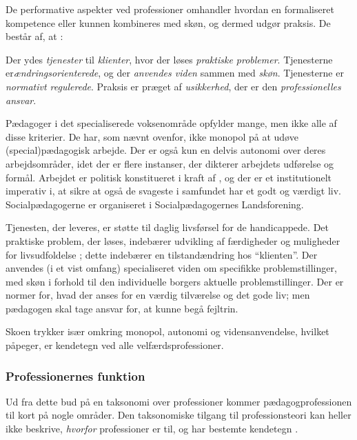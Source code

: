 De performative aspekter ved professioner omhandler hvordan en formaliseret kompetence eller kunnen kombineres med skøn, og dermed udgør praksis. De består af, at \autocite[s 19ff]{molanderProfesjonsstudierIntroduksjon2008}:

Der ydes \textit{tjenester} til \textit{klienter},  hvor der løses \textit{praktiske problemer}.
Tjenesterne er\textit{ændringsorienterede}, og der \textit{anvendes viden} sammen med \textit{skøn}.
Tjenesterne er \textit{normativt regulerede}.
Praksis er præget af \textit{usikkerhed}, der er den \textit{professionelles ansvar}.

Pædagoger i det specialiserede voksenområde opfylder mange, men ikke alle af disse kriterier.
De har, som nævnt ovenfor, ikke monopol på at udøve (special)pædagogisk arbejde.
Der er også kun en delvis autonomi over deres arbejdsområder, idet der er flere instanser, der dikterer arbejdets udførelse og formål.
Arbejdet er politisk konstitueret i kraft af \autocite{social-ogindenrigsministerietBekendtgorelseAfLov2019}, og der er et institutionelt imperativ i, at sikre at også de svageste i samfundet har et godt og værdigt liv.
Socialpædagogerne er organiseret i Socialpædagogernes Landsforening.

Tjenesten, der leveres, er støtte til daglig livsførsel for de handicappede.
Det praktiske problem, der løses, indebærer udvikling af færdigheder og muligheder for livsudfoldelse \autocite[§ 81ff]{social-ogindenrigsministerietBekendtgorelseAfLov2019}; dette indebærer en tilstandændring hos “klienten”.
Der anvendes (i et vist omfang) specialiseret viden om specifikke problemstillinger, med skøn i forhold til den individuelle borgers aktuelle problemstillinger.
Der er normer for, hvad der anses for en værdig tilværelse og det gode liv; men pædagogen skal tage ansvar for, at kunne begå fejltrin.

Skoen trykker især omkring monopol, autonomi og vidensanvendelse, hvilket \citeauthor{frederiksenVelfaerdsprofessionerMellemOmsorg2017} påpeger, er kendetegn ved alle velfærdsprofessioner.

\subsubsection{Professionernes funktion}
Ud fra dette bud på en taksonomi over professioner kommer pædagogprofessionen til kort på nogle områder.
Den taksonomiske tilgang til professionsteori kan heller ikke beskrive, \textit{hvorfor} professioner er til, og har bestemte kendetegn \autocite[s. 450]{frederiksenVelfaerdsprofessionerMellemOmsorg2017}.

